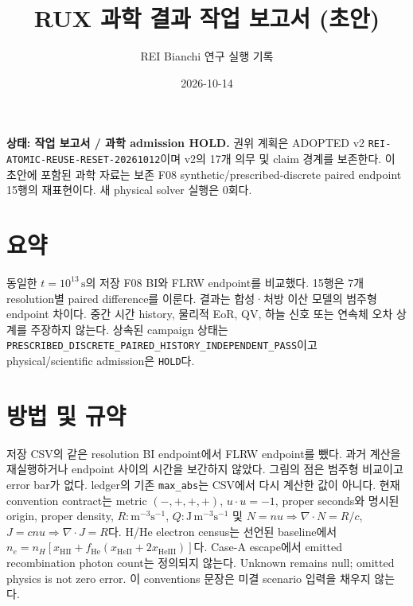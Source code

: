 \documentclass[11pt]{article}
\title{RUX 과학 결과 작업 보고서 (초안)}
\author{REI Bianchi 연구 실행 기록}
\date{2026-10-14}
\begin{document}
\maketitle
\noindent\textbf{상태: 작업 보고서 / 과학 admission HOLD.} 권위 계획은 ADOPTED v2 \texttt{REI-ATOMIC-REUSE-RESET-20261012}이며 v2의 17개 의무 및 claim 경계를 보존한다. 이 초안에 포함된 과학 자료는 보존 F08 synthetic/prescribed-discrete paired endpoint 15행의 재표현이다. 새 physical solver 실행은 0회다.
\section{요약}
동일한 $t=10^{13}\,\mathrm{s}$의 저장 F08 BI와 FLRW endpoint를 비교했다. 15행은 7개 resolution별 paired difference를 이룬다. 결과는 합성·처방 이산 모델의 범주형 endpoint 차이다. 중간 시간 history, 물리적 EoR, QV, 하늘 신호 또는 연속체 오차 상계를 주장하지 않는다. 상속된 campaign 상태는 \texttt{PRESCRIBED\_DISCRETE\_PAIRED\_HISTORY\_INDEPENDENT\_PASS}이고 physical/scientific admission은 \texttt{HOLD}다.
\section{방법 및 규약}
저장 CSV의 같은 resolution BI endpoint에서 FLRW endpoint를 뺐다. 과거 계산을 재실행하거나 endpoint 사이의 시간을 보간하지 않았다. 그림의 점은 범주형 비교이고 error bar가 없다. ledger의 기존 \texttt{max\_abs}는 CSV에서 다시 계산한 값이 아니다. 현재 convention contract는 metric $(-,+,+,+)$, $u\cdot u=-1$, proper seconds와 명시된 origin, proper density, $R:\mathrm{m}^{-3}\mathrm{s}^{-1}$, $Q:\mathrm{J}\,\mathrm{m}^{-3}\mathrm{s}^{-1}$ 및 $N=n u\Rightarrow\nabla\cdot N=R/c$, $J=c n u\Rightarrow\nabla\cdot J=R$다. H/He electron census는 선언된 baseline에서 $n_e=n_H[x_{\mathrm{HII}}+f_{\mathrm{He}}(x_{\mathrm{HeII}}+2x_{\mathrm{HeIII}})]$다. Case-A escape에서 emitted recombination photon count는 정의되지 않는다. Unknown remains null; omitted physics is not zero error. 이 conventions 문장은 미결 scenario 입력을 채우지 않는다.
\end{document}
